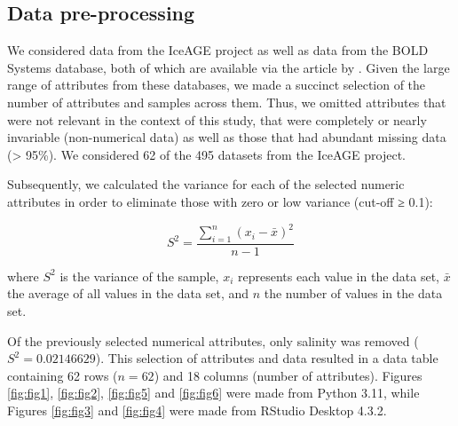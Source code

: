 \subsection{Data pre-processing}
We considered data from the IceAGE project as well as data from the BOLD Systems database, both of which are available via the article by \citep{uhlir_adding_2021}. Given the large range of attributes from these databases, we made a succinct selection of the number of attributes and samples across them. Thus, we omitted attributes that were not relevant in the context of this study, that were completely or nearly invariable (non-numerical data) as well as those that had abundant missing data (> 95\%). We considered 62 of the 495 datasets from the IceAGE project.

Subsequently, we calculated the variance for each of the selected numeric attributes in order to eliminate those with zero or low variance (cut-off ≥ 0.1):

\begin{equation}
S^2 = \frac{\sum_{i=1}^{n} (x_i - \bar{x})^2}{n-1}
\end{equation}

where \( S^2 \) is the variance of the sample, \( x_i \) represents each value in the data set, \( \bar{x} \) the average of all values in the data set, and \( n \) the number of values in the data set.

Of the previously selected numerical attributes, only salinity was removed (\( S^2 = 0.02146629 \)). This selection of attributes and data resulted in a data table containing 62 rows (\( n=62 \)) and 18 columns (number of attributes). Figures  \ref{fig:fig1},  \ref{fig:fig2}, \ref{fig:fig5} and \ref{fig:fig6} were made from Python 3.11, while Figures \ref{fig:fig3} and \ref{fig:fig4} were made from RStudio Desktop 4.3.2.

